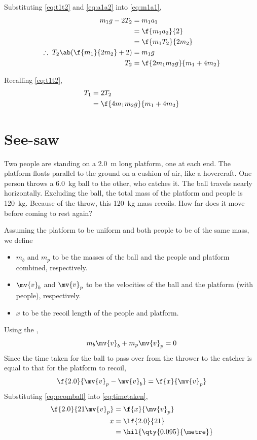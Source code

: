 Substituting \cref{eq:t1t2} and \cref{eq:a1a2} into \cref{eq:m1a1},
\begin{align*}
  m_1g - 2T_2 &= m_1a_1 \\
  &= \f{m_1a_2}{2} \\
  &= \f{m_1T_2}{2m_2} \\
  \therefore\; T_2\ab(\f{m_1}{2m_2}+2) &= m_1g \\
  T_2 &= \f{2m_1m_2g}{m_1 + 4m_2}
\end{align*}

Recalling \cref{eq:t1t2},
\begin{align*}
  T_1 &= 2T_2 \\
  &= \f{4m_1m_2g}{m_1+4m_2}
\end{align*}

\section{See-saw}
\begin{problem}
  Two people are standing on a \qty{2.0}{\metre} long platform, one at
  each end. The platform floats parallel
  to the ground on a cushion of air, like a hovercraft. One person
  throws a \qty{6.0}{\kg} ball
  to the other, who catches it. The ball travels nearly horizontally.
  Excluding the ball, the total mass of the platform and people is
  \qty{120}{\kg}. Because of the throw, this \qty{120}{\kg} mass
  recoils. How far
  does it move before coming to rest again?
\end{problem}

Assuming the platform to be uniform and both people to be of the same
mass, we define
\begin{itemize}
  \item \(m_b\) and \(m_p\) to be the masses of the ball and the
    people and platform combined, respectively.
  \item \(\mv{v}_b\) and \(\mv{v}_p\) to be the velocities of the ball
    and the platform (with people), respectively.
  \item \(x\) to be the recoil length of the people and platform.
\end{itemize}
Using the ,
\begin{equation}
  m_b\mv{v}_b + m_p\mv{v}_p = 0
  \label{eq:pcomball}
\end{equation}
Since the time taken for the ball to pass over from the thrower to the catcher
is equal to that for the platform to recoil,
\begin{equation}
  \f{2.0}{\mv{v}_p - \mv{v}_b} = \f{x}{\mv{v}_p}
  \label{eq:timetaken}
\end{equation}
Substituting \cref{eq:pcomball} into \cref{eq:timetaken},
\begin{align*}
  \f{2.0}{21\mv{v}_p} &= \f{x}{\mv{v}_p}\\
  x &= \lf{2.0}{21} \\
  &= \hil{\qty{0.095}{\metre}}
\end{align*}

